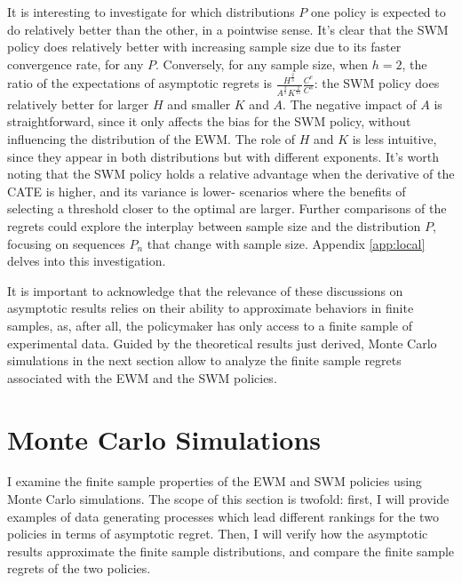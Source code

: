 {It is interesting to investigate for which distributions $P$ one policy is expected to do relatively better than the other, in a pointwise sense. It's clear that the SWM policy does relatively better with increasing sample size due to its faster convergence rate, for any $P$. Conversely, for any sample size, when $h=2$, the ratio of the expectations of asymptotic regrets is $\frac{H^\frac{2}{3}}{A^\frac{2}{5} K^\frac{2}{15}} \frac{C^e}{C^s}$: the SWM policy does relatively better for larger $H$ and smaller $K$ and $A$. The negative impact of $A$ is straightforward, since it only affects the bias for the SWM policy, without influencing the distribution of the EWM. The role of $H$ and $K$ is less intuitive, since they appear in both distributions but with different exponents. It's worth noting that the SWM policy holds a relative advantage when the derivative of the CATE is higher, and its variance is lower- scenarios where the benefits of selecting a threshold closer to the optimal are larger. Further comparisons of the regrets could explore the interplay between sample size and the distribution $P$, focusing on sequences $P_n$ that change with sample size. Appendix \ref{app:local} delves into this investigation.

It is important to acknowledge that the relevance of these discussions on asymptotic results relies on their ability to approximate behaviors in finite samples, as, after all, the policymaker has only access to a finite sample of experimental data. Guided by the theoretical results just derived, Monte Carlo simulations in the next section allow to analyze the finite sample regrets associated with the EWM and the SWM policies.

\section{Monte Carlo Simulations} \label{sec:mc}

I examine the finite sample properties of the EWM and SWM policies using Monte Carlo simulations. The scope of this section is twofold: first, I will provide examples of data generating processes which lead different rankings for the two policies in terms of asymptotic regret. Then, I will verify how the asymptotic results approximate the finite sample distributions, and compare the finite sample regrets of the two policies.

}
